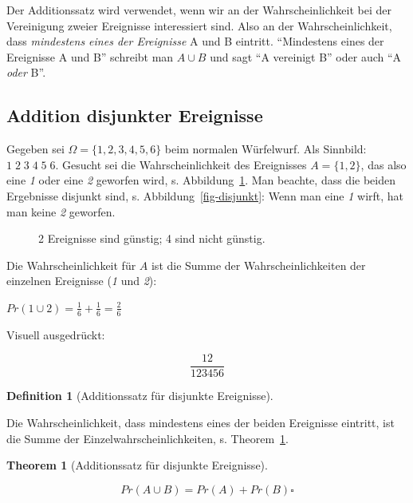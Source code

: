 \documentclass[
  ngerman,
  letterpaper,
  twoside,
  open=any]{scrbook}
\theoremstyle{definition}
\theoremstyle{plain}
\newtheorem{theorem}{Theorem}[chapter]
\theoremstyle{definition}
\theoremstyle{definition}
\newtheorem{definition}{Definition}[chapter]
\theoremstyle{remark}
\begin{document}
Der Additionssatz wird verwendet, wenn wir an der Wahrscheinlichkeit bei
der Vereinigung zweier Ereignisse interessiert sind. Also an der
Wahrscheinlichkeit, dass \emph{mindestens eines der Ereignisse} A und B
eintritt. \enquote{Mindestens eines der Ereignisse A und B} schreibt man
\(A \cup B\) und sagt \enquote{A vereinigt B} oder auch \enquote{A
\emph{oder} B}.

\subsection{Addition disjunkter
Ereignisse}\label{addition-disjunkter-ereignisse}

Gegeben sei \(\Omega = \{1,2,3,4,5,6\}\) beim normalen Würfelwurf. Als
Sinnbild: \(\boxed{1\; 2\; 3\; 4\; 5\; 6}\). Gesucht sei die
Wahrscheinlichkeit des Ereignisses \(A=\{1,2\}\), das also eine \emph{1}
oder eine \emph{2} geworfen wird, s. Abbildung~\ref{fig-addition-boxed}.
Man beachte, dass die beiden Ergebnisse disjunkt sind, s.
Abbildung~\ref{fig-disjunkt}: Wenn man eine \emph{1} wirft, hat man
keine \emph{2} geworfen.

\begin{figure}[H]


\caption{\label{fig-addition-boxed}2 Ereignisse sind günstig; 4 sind
nicht günstig.}

\end{figure}%

Die Wahrscheinlichkeit für \(A\) ist die Summe der Wahrscheinlichkeiten
der einzelnen Ereignisse (\emph{1} und \emph{2}):

\(Pr(1 \cup 2) = \frac{1}{6} + \frac{1}{6} = \frac{2}{6}\)

Visuell ausgedrückt:

\[\frac{\boxed{12}}{\boxed{123456}}\]

\begin{definition}[Additionssatz für disjunkte
Ereignisse]\protect\hypertarget{def-add-disjunkt}{}\label{def-add-disjunkt}

Die Wahrscheinlichkeit, dass mindestens eines der beiden Ereignisse
eintritt, ist die Summe der Einzelwahrscheinlichkeiten, s.
Theorem~\ref{thm-add-disjunkt}.

\end{definition}

\begin{theorem}[Additionssatz für disjunkte
Ereignisse]\protect\hypertarget{thm-add-disjunkt}{}\label{thm-add-disjunkt}

\[Pr(A \cup B) = Pr(A) + Pr(B) \square\]

\end{theorem}
\end{document}
